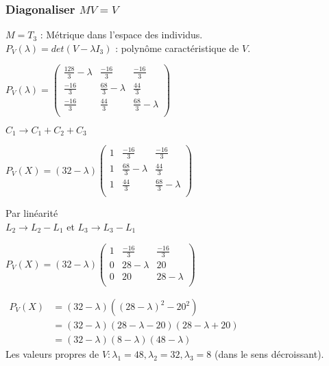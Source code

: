 \documentclass[a4paper, 12pt]{article}
\begin{document}
\subsubsection{Diagonaliser $MV = V$}
\begin{flushleft}
$M = T_3$ : Métrique dans l'espace des individus. \\
$P_V(\lambda) = det(V - \lambda I_3)$ : polynôme caractéristique de $V$. \\

\begin{center}
{\Large
$P_V(\lambda) =
\begin{pmatrix}
\frac{128}{3} - \lambda & \frac{-16}{3} & \frac{-16}{3} \\
\frac{-16}{3} & \frac{68}{3} - \lambda & \frac{44}{3} \\
\frac{-16}{3} & \frac{44}{3} & \frac{68}{3} - \lambda \\
\end{pmatrix}
$} \\
\end{center}

$C_1 \rightarrow C_1 + C_2 + C_3$ \\

\begin{center}
{\Large
$P_V(X) = (32 - \lambda)
\begin{pmatrix}
1 & \frac{-16}{3} & \frac{-16}{3} \\
1 & \frac{68}{3} - \lambda & \frac{44}{3} \\
1 & \frac{44}{3} & \frac{68}{3} - \lambda \\
\end{pmatrix}
$}
\end{center}

Par linéarité \\
$L_2 \rightarrow L_2 - L_1$ et $L_3 \rightarrow L_3 - L_1$

\begin{center}
{\Large
$P_V(X) = (32 - \lambda)
\begin{pmatrix}
1 & \frac{-16}{3} & \frac{-16}{3} \\
0 & 28 - \lambda & 20 \\
0 & 20 & 28 - \lambda \\
\end{pmatrix}
$}
\end{center}

$
\begin{aligned}
P_V(X) &= (32 - \lambda)((28 - \lambda)^2 - 20^2) \\
&= (32 - \lambda)(28 - \lambda - 20)(28 - \lambda + 20) \\
&= (32 - \lambda)(8 - \lambda)(48 - \lambda)
\end{aligned}
$ \\
\medskip
Les valeurs propres de $V : \lambda_1 = 48, \lambda_2 = 32, \lambda_3 = 8$ (dans le sens décroissant).
\end{flushleft}
\end{document}
